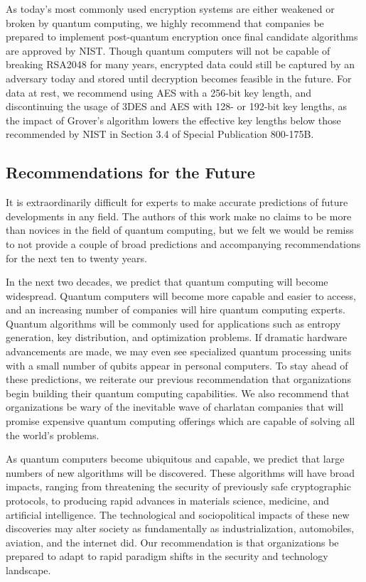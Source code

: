 \documentclass[sigconf]{acmart}
\begin{document}
As today's most commonly used encryption systems are either weakened or broken by quantum computing, we highly recommend that companies be prepared to implement post-quantum encryption once final candidate algorithms are approved by NIST. Though quantum computers will not be capable of breaking RSA2048 for many years, encrypted data could still be captured by an adversary today and stored until decryption becomes feasible in the future. For data at rest, we recommend using AES with a 256-bit key length, and discontinuing the usage of 3DES and AES with 128- or 192-bit key lengths, as the impact of Grover's algorithm lowers the effective key lengths below those recommended by NIST in Section 3.4 of Special Publication 800-175B\cite{barker_guideline_2020}. %

\subsection{Recommendations for the Future}
It is extraordinarily difficult for experts to make accurate predictions of future developments in any field. The authors of this work make no claims to be more than novices in the field of quantum computing, but we felt we would be remiss to not provide a couple of broad predictions and accompanying recommendations for the next ten to twenty years.

In the next two decades, we predict that quantum computing will become widespread. Quantum computers will become more capable and easier to access, and an increasing number of companies will hire quantum computing experts. Quantum algorithms will be commonly used for applications such as entropy generation, key distribution, and optimization problems. If dramatic hardware advancements are made, we may even see specialized quantum processing units with a small number of qubits appear in personal computers. To stay ahead of these predictions, we reiterate our previous recommendation that organizations begin building their quantum computing capabilities. We also recommend that organizations be wary of the inevitable wave of charlatan companies that will promise expensive quantum computing offerings which are capable of solving all the world's problems.

As quantum computers become ubiquitous and capable, we predict that large numbers of new algorithms will be discovered. These algorithms will have broad impacts, ranging from threatening the security of previously safe cryptographic protocols, to producing rapid advances in materials science, medicine, and artificial intelligence. The technological and sociopolitical impacts of these new discoveries may alter society as fundamentally as industrialization, automobiles, aviation, and the internet did. Our recommendation is that organizations be prepared to adapt to rapid paradigm shifts in the security and technology landscape.
\end{document}
